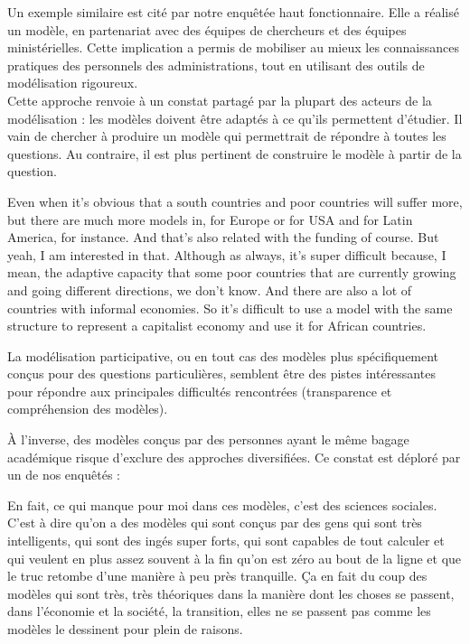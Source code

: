 Un exemple similaire est cité par notre enquêtée haut fonctionnaire. Elle a réalisé un modèle, en partenariat avec des équipes de chercheurs et des équipes ministérielles. Cette implication a permis de mobiliser au mieux les connaissances pratiques des personnels des administrations, tout en utilisant des outils de modélisation rigoureux. \\


Cette approche renvoie à un constat partagé par la plupart des acteurs de la modélisation : les modèles doivent être adaptés à ce qu'ils permettent d'étudier. Il vain de chercher à produire un modèle qui permettrait de répondre à toutes les questions. Au contraire, il est plus pertinent de construire le modèle à partir de la question. 

\begin{authoredquote}
    Even when it's obvious that  a south countries and poor countries will suffer more, but there are much more models in, for Europe or for USA and for Latin America, for instance. And that's also related with the  funding of course. But yeah, I am interested in that. Although as always, it's super difficult  because, I mean, the adaptive capacity that some poor countries that are currently growing and going different directions, we don't know. And there are also a lot of countries with informal economies. So it's difficult to use a model with the same structure to represent  a capitalist economy and use it for African countries.
\end{authoredquote}

La modélisation participative, ou en tout cas des modèles plus spécifiquement conçus pour des questions particulières, semblent être des pistes intéressantes pour répondre aux principales difficultés rencontrées (transparence et compréhension des modèles).

À l'inverse, des modèles conçus par des personnes ayant le même bagage académique risque d'exclure des approches diversifiées. Ce constat est déploré par un de nos enquêtés : 

\begin{authoredquote}
    En fait, ce qui manque pour moi dans ces modèles, c'est des sciences sociales. C'est à dire qu'on a des modèles qui sont conçus par des gens qui sont très intelligents, qui sont des ingés super forts, qui sont capables de tout calculer et qui veulent en plus assez souvent à la fin qu'on est zéro au bout de la ligne et que le truc retombe d'une manière à peu près tranquille. Ça en fait du coup des modèles qui sont très, très théoriques dans la manière dont les choses se passent, dans l'économie et la société, la transition, elles ne se passent pas comme les modèles le dessinent pour plein de raisons.
\end{authoredquote}

